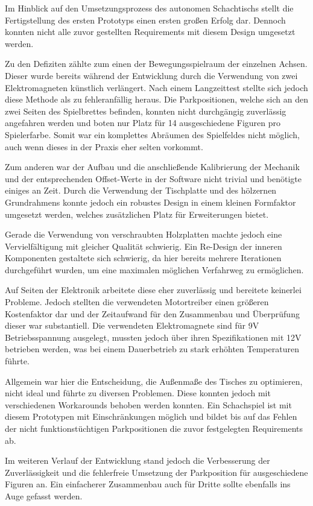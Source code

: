 Im Hinblick auf den Umsetzungsprozess des autonomen Schachtischs stellt
die Fertigstellung des ersten Prototyps einen ersten großen Erfolg dar.
Dennoch konnten nicht alle zuvor gestellten Requirements mit diesem
Design umgesetzt werden.

Zu den Defiziten zählte zum einen der Bewegungsspielraum der einzelnen
Achsen. Dieser wurde bereits während der Entwicklung durch die
Verwendung von zwei Elektromagneten künstlich verlängert. Nach einem
Langzeittest stellte sich jedoch diese Methode als zu fehleranfällig
heraus. Die Parkpositionen, welche sich an den zwei Seiten des
Spielbrettes befinden, konnten nicht durchgängig zuverlässig angefahren
werden und boten nur Platz für 14 ausgeschiedene Figuren pro
Spielerfarbe. Somit war ein komplettes Abräumen des Spielfeldes nicht
möglich, auch wenn dieses in der Praxis eher selten vorkommt.

Zum anderen war der Aufbau und die anschließende Kalibrierung der
Mechanik und der entsprechenden Offset-Werte in der Software nicht
trivial und benötigte einiges an Zeit. Durch die Verwendung der
Tischplatte und des hölzernen Grundrahmens konnte jedoch ein robustes
Design in einem kleinen Formfaktor umgesetzt werden, welches
zusätzlichen Platz für Erweiterungen bietet.

Gerade die Verwendung von verschraubten Holzplatten machte jedoch eine
Vervielfältigung mit gleicher Qualität schwierig. Ein Re-Design der
inneren Komponenten gestaltete sich schwierig, da hier bereits mehrere
Iterationen durchgeführt wurden, um eine maximalen möglichen Verfahrweg
zu ermöglichen.

Auf Seiten der Elektronik arbeitete diese eher zuverlässig und bereitete
keinerlei Probleme. Jedoch stellten die verwendeten Motortreiber einen
größeren Kostenfaktor dar und der Zeitaufwand für den Zusammenbau und
Überprüfung dieser war substantiell. Die verwendeten Elektromagnete sind
für 9V Betriebsspannung ausgelegt, mussten jedoch über ihren
Spezifikationen mit 12V betrieben werden, was bei einem Dauerbetrieb zu
stark erhöhten Temperaturen führte.

Allgemein war hier die Entscheidung, die Außenmaße des Tisches zu
optimieren, nicht ideal und führte zu diversen Problemen. Diese konnten
jedoch mit verschiedenen Workarounds behoben werden konnten. Ein
Schachspiel ist mit diesem Prototypen mit Einschränkungen möglich und
bildet bis auf das Fehlen der nicht funktionstüchtigen Parkpositionen
die zuvor festgelegten Requirements ab.

Im weiteren Verlauf der Entwicklung stand jedoch die Verbesserung der
Zuverlässigkeit und die fehlerfreie Umsetzung der Parkposition für
ausgeschiedene Figuren an. Ein einfacherer Zusammenbau auch für Dritte
sollte ebenfalls ins Auge gefasst werden.

